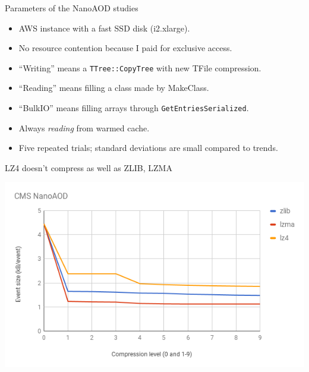 \documentclass[aspectratio=169]{beamer}
\begin{document}
\begin{frame}{Parameters of the NanoAOD studies}
\vspace{0.25 cm}
\begin{center}
\begin{minipage}{0.9\linewidth}
\begin{itemize}
\item AWS instance with a fast SSD disk (i2.xlarge).
\item No resource contention because I paid for exclusive access.
\item ``Writing'' means a {\tt TTree::CopyTree} with new TFile compression.
\item ``Reading'' means filling a class made by MakeClass.
\item ``BulkIO'' means filling arrays through {\tt GetEntriesSerialized}.
\item Always {\it reading} from warmed cache.
\item Five repeated trials; standard deviations are small compared to trends.
\end{itemize}
\end{minipage}
\end{center}
\end{frame}

\begin{frame}{LZ4 doesn't compress as well as ZLIB, LZMA}
\vspace{0.1 cm}
\begin{center}
\includegraphics[width=0.9\linewidth]{size-vs-compression.png}
\end{center}
\end{frame}
\end{document}
